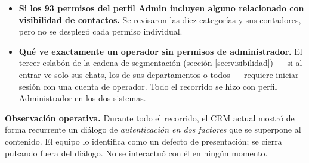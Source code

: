 \documentclass[11pt,a4paper]{article}
\begin{document}
\begin{itemize}
  \item \textbf{Si los 93 permisos del perfil Admin incluyen alguno relacionado con
        visibilidad de contactos.} Se revisaron las diez categorías y sus contadores,
        pero no se desplegó cada permiso individual.

  \item \textbf{Qué ve exactamente un operador sin permisos de administrador.} El tercer
        eslabón de la cadena de segmentación (sección \ref{sec:visibilidad}) --- si al
        entrar ve solo sus chats, los de sus departamentos o todos --- requiere iniciar
        sesión con una cuenta de operador. Todo el recorrido se hizo con perfil
        Administrador en los dos sistemas.
\end{itemize}

\begin{nota}
\textbf{Observación operativa.} Durante todo el recorrido, el CRM actual mostró de forma
recurrente un diálogo de \emph{autenticación en dos factores} que se superpone al
contenido. El equipo lo identifica como un defecto de presentación; se cierra pulsando
fuera del diálogo. No se interactuó con él en ningún momento.
\end{nota}
\end{document}
